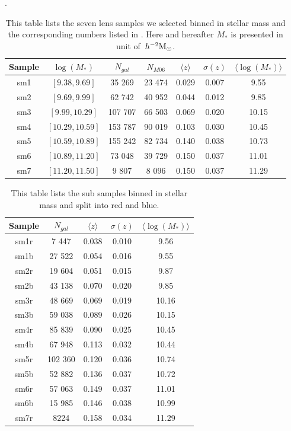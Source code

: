 \documentclass[apj]{emulateapj}
\newcommand{\msunhh}{\>h^{-2}\rm M_\odot}
\begin{document}
\begin{table}[h!]
\begin{center}
 \caption{\label{tab:tb2-1} This table lists the seven lens samples we
    selected binned in stellar mass and the corresponding numbers listed in
    \citet[hereafter M06]{Mandelbaum2006}. Here and hereafter $M_*$ is presented in unit of
    $\msunhh$. }.
\begin{tabular}{ccccccc}
\hline
Sample & $\log(M_*)$ & $N_{gal}$ & $N_{M06}$ & $\langle z \rangle $ & $\sigma(z)$ & $\langle \log(M_*) \rangle$\\
\hline
sm1  & $[9.38,9.69]$    & 35 269  & 23 474   & 0.029 & 0.007  & 9.55 \\
sm2  & $[9.69,9.99]$    & 62 742  & 40 952   & 0.044 & 0.012  & 9.85 \\
sm3  & $[9.99,10.29]$   & 107 707 & 66 503   & 0.069 & 0.020  & 10.15 \\
sm4  & $[10.29,10.59]$  & 153 787 & 90 019   & 0.103 & 0.030  & 10.45 \\
sm5  & $[10.59,10.89]$  & 155 242 & 82 734   & 0.140 & 0.038  & 10.73 \\
sm6  & $[10.89,11.20]$  & 73 048  & 39 729   & 0.150 & 0.037  & 11.01 \\
sm7  & $[11.20,11.50]$  & 9 807   & 8 096    & 0.150 & 0.037  & 11.29 \\
\hline
\end{tabular}
\end{center}
\end{table}


\begin{table}[h!]
\begin{center}
  \caption{\label{tab:tb2-2} This table lists the sub samples binned
    in stellar mass and split into red and blue.}
\begin{tabular}{ccccc}
\hline
Sample & $N_{gal}$ & $\langle z \rangle $ & $\sigma(z)$ & $\langle \log(M_*) \rangle$\\
\hline
sm1r   & 7 447   & 0.038  & 0.010  & 9.56 \\
sm1b   & 27 522  & 0.054  & 0.016  & 9.55 \\
sm2r   & 19 604  & 0.051  & 0.015  & 9.87 \\
sm2b   & 43 138  & 0.070  & 0.020  & 9.85 \\
sm3r   & 48 669  & 0.069  & 0.019  & 10.16 \\
sm3b   & 59 038  & 0.089  & 0.026  & 10.15 \\
sm4r   & 85 839  & 0.090  & 0.025  & 10.45 \\
sm4b   & 67 948  & 0.113  & 0.032  & 10.44 \\
sm5r   & 102 360 & 0.120  & 0.036  & 10.74 \\
sm5b   & 52 882  & 0.136  & 0.037  & 10.72 \\
sm6r   & 57 063  & 0.149  & 0.037  & 11.01 \\
sm6b   & 15 985  & 0.146  & 0.038  & 10.99 \\
sm7r   & 8224    & 0.158  & 0.034  & 11.29 \\
\hline
\end{tabular}
\end{center}
\end{table}
\end{document}
